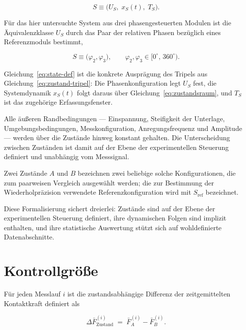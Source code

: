 \documentclass[12pt,a4paper]{report}
\begin{document}
\begin{equation}
S \equiv \bigl(U_S,\; x_S(t),\; T_S\bigr).
\label{eq:zustand-tripel}
\end{equation}

Für das hier untersuchte System aus drei phasengesteuerten Modulen ist
die Äquivalenzklasse $U_S$ durch das Paar der relativen Phasen bezüglich
eines Referenzmoduls bestimmt,

\begin{equation}
  S \equiv \bigl(\varphi_2, \varphi_3\bigr),
  \qquad \varphi_2, \varphi_3 \in [0^\circ,\, 360^\circ).
  \label{eq:state-def}
\end{equation}

Gleichung~\eqref{eq:state-def} ist die konkrete Ausprägung des Tripels
aus Gleichung~\eqref{eq:zustand-tripel}: Die Phasenkonfiguration legt
$U_S$ fest, die Systemdynamik $x_S(t)$ folgt daraus über
Gleichung~\eqref{eq:zustandsraum}, und $T_S$ ist das zugehörige
Erfassungsfenster.

Alle äußeren Randbedingungen --- Einspannung, Steifigkeit der Unterlage,
Umgebungsbedingungen, Messkonfiguration, Anregungsfrequenz und
Amplitude --- werden über die Zustände hinweg konstant gehalten. Die
Unterscheidung zwischen Zuständen ist damit auf der Ebene der
experimentellen Steuerung definiert und unabhängig vom Messsignal.

Zwei Zustände $A$ und $B$ bezeichnen zwei beliebige solche
Konfigurationen, die zum paarweisen Vergleich ausgewählt werden; die zur
Bestimmung der Wiederholpräzision verwendete Referenzkonfiguration wird
mit $S_{\mathrm{ref}}$ bezeichnet.

Diese Formalisierung sichert dreierlei: Zustände sind auf der Ebene der
experimentellen Steuerung definiert, ihre dynamischen Folgen sind
implizit enthalten, und ihre statistische Auswertung stützt sich auf
wohldefinierte Datenabschnitte.

\section{Kontrollgröße}

Für jeden Messlauf $i$ ist die zustandsabhängige Differenz der
zeitgemittelten Kontaktkraft definiert als

\begin{equation}
  \Delta \bar{F}^{(i)}_{\mathrm{Zustand}}
  \;=\; \bar{F}^{(i)}_{A} - \bar{F}^{(i)}_{B}.
  \label{eq:control-quantity}
\end{equation}
\end{document}
